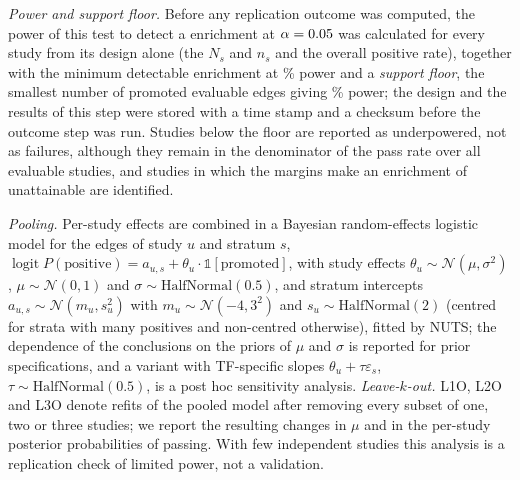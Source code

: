 \emph{Power and support floor.} Before any replication outcome was computed, the power of this test to detect a \nRepTrueEnrFold{} enrichment at $\alpha=0.05{}$ was calculated for every study from its design alone (the $N_s$ and $n_s$ and the overall positive rate), together with the minimum detectable enrichment at \nRepPowerPct{}\% power and a \emph{support floor}, the smallest number of promoted evaluable edges giving \nRepPowerPct{}\% power; the design and the results of this step were stored with a time stamp and a checksum before the outcome step was run.
Studies below the floor are reported as underpowered, not as failures, although they remain in the denominator of the pass rate over all evaluable studies, and studies in which the margins make an enrichment of \nRepEndpoint{} unattainable are identified.

\emph{Pooling.} Per-study effects are combined in a Bayesian random-effects logistic model for the edges of study $u$ and stratum $s$, $\operatorname{logit}P(\text{positive})=a_{u,s}+\theta_u\cdot\mathbb{1}[\text{promoted}]$, with study effects $\theta_u\sim\mathcal{N}(\mu,\sigma^2)$, $\mu\sim\mathcal{N}(0,1)$ and $\sigma\sim\mathrm{HalfNormal}(0.5)$, and stratum intercepts $a_{u,s}\sim\mathcal{N}(m_u,s_u^2)$ with $m_u\sim\mathcal{N}(-4,3^2)$ and $s_u\sim\mathrm{HalfNormal}(2)$ (centred for strata with many positives and non-centred otherwise), fitted by NUTS; the dependence of the conclusions on the priors of $\mu$ and $\sigma$ is reported for \nRepNPriors{} prior specifications, and a variant with TF-specific slopes $\theta_u+\tau\varepsilon_s$, $\tau\sim\mathrm{HalfNormal}(0.5)$, is a post hoc sensitivity analysis.
\emph{Leave-$k$-out.} L1O, L2O and L3O denote refits of the pooled model after removing every subset of one, two or three studies; we report the resulting changes in $\mu$ and in the per-study posterior probabilities of passing.
With few independent studies this analysis is a replication check of limited power, not a validation.
